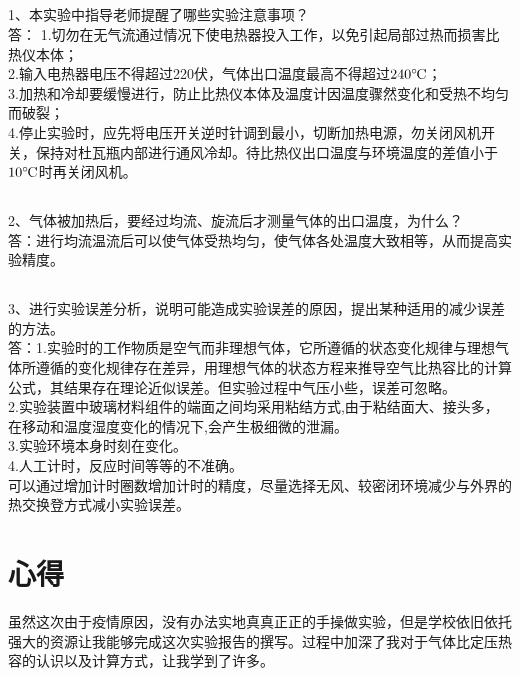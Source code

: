 \documentclass[UTF8,a4paper,10pt]{ctexart}
\def \celsius{\ensuremath{^\circ\hspace{-0.09em}\mathrm{C}}}
\begin{document}
\subsection{}
1、本实验中指导老师提醒了哪些实验注意事项？ \\
答：
1.切勿在无气流通过情况下使电热器投入工作，以免引起局部过热而损害比热仪本体；\\
2.输入电热器电压不得超过220伏，气体出口温度最高不得超过$240\celsius$；\\
3.加热和冷却要缓慢进行，防止比热仪本体及温度计因温度骤然变化和受热不均匀而破裂；\\
4.停止实验时，应先将电压开关逆时针调到最小，切断加热电源，勿关闭风机开关，保持对杜瓦瓶内部进行通风冷却。待比热仪出口温度与环境温度的差值小于$10\celsius$时再关闭风机。
\subsection{}
2、气体被加热后，要经过均流、旋流后才测量气体的出口温度，为什么？ \\
答：进行均流温流后可以使气体受热均匀，使气体各处温度大致相等，从而提高实验精度。

\subsection{}
3、进行实验误差分析，说明可能造成实验误差的原因，提出某种适用的减少误差的方法。\\
答：1.实验时的工作物质是空气而非理想气体，它所遵循的状态变化规律与理想气体所遵循的变化规律存在差异，用理想气体的状态方程来推导空气比热容比的计算公式，其结果存在理论近似误差。但实验过程中气压小些，误差可忽略。\\
2.实验装置中玻璃材料组件的端面之间均采用粘结方式,由于粘结面大、接头多，在移动和温度湿度变化的情况下,会产生极细微的泄漏。\\
3.实验环境本身时刻在变化。\\
4.人工计时，反应时间等等的不准确。\\
可以通过增加计时圈数增加计时的精度，尽量选择无风、较密闭环境减少与外界的热交换登方式减小实验误差。
\section{心得}
虽然这次由于疫情原因，没有办法实地真真正正的手操做实验，但是学校依旧依托强大的资源让我能够完成这次实验报告的撰写。过程中加深了我对于气体比定压热容的认识以及计算方式，让我学到了许多。
	
\end{document}
